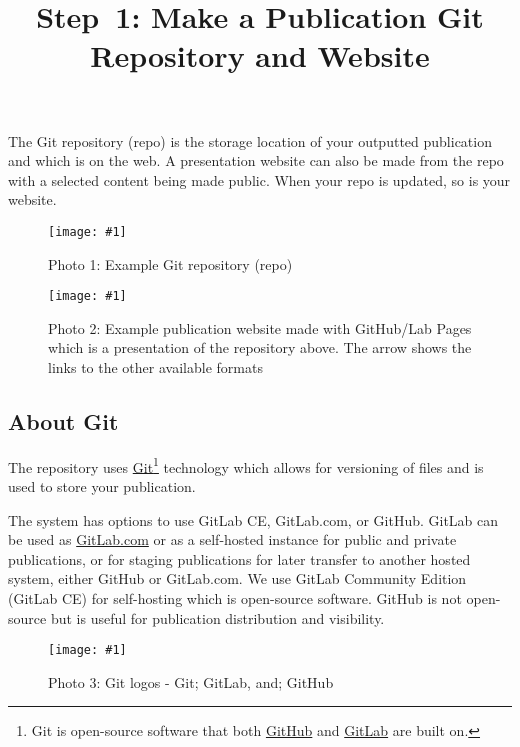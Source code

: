 \documentclass{article}
\newlength{\imgwidth}
\newcommand\scaledgraphics[2]{%
                
\settowidth{\imgwidth}{\texttt{[image: \#1]}}%
                
\setlength{\imgwidth}{\minof{\imgwidth}{#2\textwidth}}%
                
\texttt{[image: \#1]}%
                
}
\begin{document}
\title{Step 1: Make a Publication Git Repository and Website}

\maketitle


The Git repository (repo) is the storage location of your outputted publication and which is on the web. A presentation website can also be made from the repo with a selected content being made public. When your repo is updated, so is your website.

\begin{figure}
\scaledgraphics{d80dc5a5-d385-4a3b-a03a-a752ff2686c9.png}{1}
\caption*{Photo 1: Example Git repository (repo)}\label{F55869431}
\end{figure}

\begin{figure}
\scaledgraphics{8b26a358-6fdd-41c6-91aa-2a1fbbf977cc.png}{1}
\caption*{Photo 2: Example publication website made with GitHub/Lab Pages which is a presentation of the repository above. The arrow shows the links to the other available formats}\label{F88093361}
\end{figure}


\subsection{About Git}\label{H4018151}



The repository uses \href{https://git-scm.com/}{Git}\footnote{Git is open-source software that both \href{https://github.com/}{GitHub} and \href{https://about.gitlab.com/}{GitLab} are built on.} technology which allows for versioning of files and is used to store your publication. 


The system has options to use GitLab CE, GitLab.com, or GitHub. GitLab can be used as \href{GitLab.com}{GitLab.com} or as a self-hosted instance for public and private publications, or for staging publications for later transfer to another hosted system, either GitHub or GitLab.com. We use GitLab Community Edition (GitLab CE) for self-hosting which is open-source software. GitHub is not open-source but is useful for publication distribution and visibility.

\begin{figure}
\scaledgraphics{690aad43-615e-4dee-bc82-c46c7c86bd8d.png}{1}
\caption*{Photo 3: Git logos - Git; GitLab, and; GitHub}\label{F88034391}
\end{figure}
\end{document}
